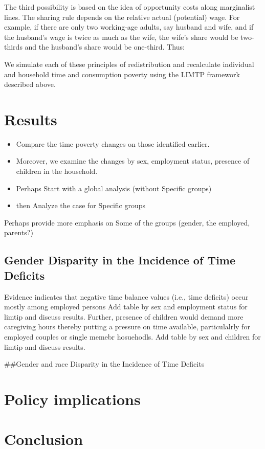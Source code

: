 \documentclass[
  11pt,
]{article}
\begin{document}
The third possibility is based on the idea of opportunity costs along
marginalist lines. The sharing rule depends on the relative actual
(potential) wage. For example, if there are only two working-age adults,
say husband and wife, and if the husband's wage is twice as much as the
wife, the wife's share would be two-thirds and the husband's share would
be one-third. Thus:

We simulate each of these principles of redistribution and recalculate
individual and household time and consumption poverty using the LIMTP
framework described above.

\section{Results}\label{results}

\begin{itemize}
\item
  Compare the time poverty changes on those identified earlier.
\item
  Moreover, we examine the changes by sex, employment status, presence
  of children in the household.
\item
  Perhaps Start with a global analysis (without Specific groups)
\item
  then Analyze the case for Specific groups
\end{itemize}

Perhaps provide more emphasis on Some of the groups (gender, the
employed, parents?)

\subsection{Gender Disparity in the Incidence of Time
Deficits}\label{gender-disparity-in-the-incidence-of-time-deficits}

Evidence indicates that negative time balance values (i.e., time
deficits) occur mostly among employed persons Add table by sex and
employment status for limtip and discuss results. Further, presence of
children would demand more caregiving hours thereby putting a pressure
on time available, particulalrly for employed couples or single memebr
hosuehodls. Add table by sex and children for limtip and discuss
results.

\#\#Gender and race Disparity in the Incidence of Time Deficits

\section{Policy implications}\label{policy-implications}

\section{Conclusion}\label{conclusion}
\end{document}
